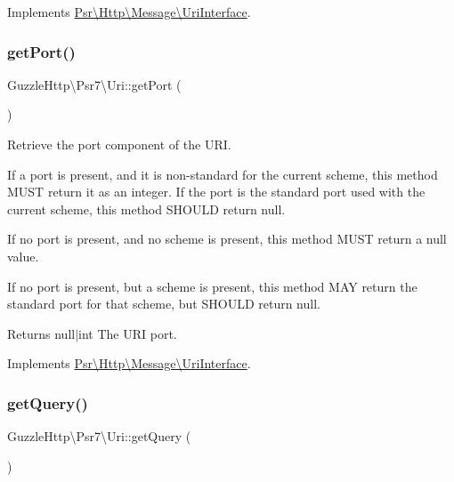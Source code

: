 Implements \hyperlink{interfacePsr_1_1Http_1_1Message_1_1UriInterface_aa50072ff08f6acf7c35aa5ebd0ae91cd}{Psr\textbackslash{}\+Http\textbackslash{}\+Message\textbackslash{}\+Uri\+Interface}.

\mbox{\label{classGuzzleHttp_1_1Psr7_1_1Uri_abea314869a6934b7675dd516c72715f9}} 
\subsubsection{\texorpdfstring{get\+Port()}{getPort()}}
{\footnotesize\ttfamily Guzzle\+Http\textbackslash{}\+Psr7\textbackslash{}\+Uri\+::get\+Port (\begin{DoxyParamCaption}{ }\end{DoxyParamCaption})}

Retrieve the port component of the U\+RI.

If a port is present, and it is non-\/standard for the current scheme, this method M\+U\+ST return it as an integer. If the port is the standard port used with the current scheme, this method S\+H\+O\+U\+LD return null.

If no port is present, and no scheme is present, this method M\+U\+ST return a null value.

If no port is present, but a scheme is present, this method M\+AY return the standard port for that scheme, but S\+H\+O\+U\+LD return null.

\begin{DoxyReturn}{Returns}
null$\vert$int The U\+RI port. 
\end{DoxyReturn}


Implements \hyperlink{interfacePsr_1_1Http_1_1Message_1_1UriInterface_aa6738a90dce8e99c3b0fc6a73f34cd62}{Psr\textbackslash{}\+Http\textbackslash{}\+Message\textbackslash{}\+Uri\+Interface}.

\mbox{\label{classGuzzleHttp_1_1Psr7_1_1Uri_a67650b5b4d619cb30e2951da11d0f369}} 
\subsubsection{\texorpdfstring{get\+Query()}{getQuery()}}
{\footnotesize\ttfamily Guzzle\+Http\textbackslash{}\+Psr7\textbackslash{}\+Uri\+::get\+Query (\begin{DoxyParamCaption}{ }\end{DoxyParamCaption})}

